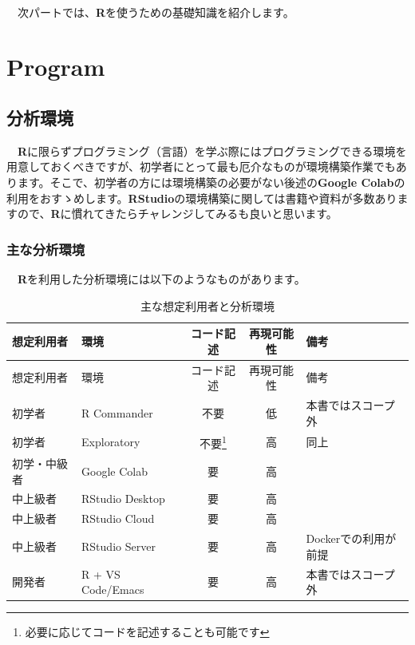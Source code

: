 \documentclass[
  12pt,
]{book}
\begin{document}
　

　次パートでは、\textbf{R}を使うための基礎知識を紹介します。

\hypertarget{part-program}{%
\part{Program}\label{part-program}}

\hypertarget{ux5206ux6790ux74b0ux5883}{%
\chapter{分析環境}\label{ux5206ux6790ux74b0ux5883}}

　\textbf{R}に限らずプログラミング（言語）を学ぶ際にはプログラミングできる環境を用意しておくべきですが、初学者にとって最も厄介なものが環境構築作業でもあります。そこで、初学者の方には環境構築の必要がない後述の\textbf{Google Colab}の利用をおすゝめします。\textbf{RStudio}の環境構築に関しては書籍や資料が多数ありますので、\textbf{R}に慣れてきたらチャレンジしてみるも良いと思います。

\hypertarget{ux4e3bux306aux5206ux6790ux74b0ux5883}{%
\section{主な分析環境}\label{ux4e3bux306aux5206ux6790ux74b0ux5883}}

　\textbf{R}を利用した分析環境には以下のようなものがあります。

\begin{longtable}[]{@{}llccl@{}}
\caption{主な想定利用者と分析環境}\tabularnewline
\toprule
想定利用者 & 環境 & コード記述 & 再現可能性 & 備考 \\
\midrule
\endfirsthead
\toprule
想定利用者 & 環境 & コード記述 & 再現可能性 & 備考 \\
\midrule
\endhead
初学者 & R Commander & 不要 & 低 & 本書ではスコープ外 \\
初学者 & Exploratory & 不要\footnote{必要に応じてコードを記述することも可能です} & 高 & 同上 \\
初学・中級者 & Google Colab & 要 & 高 & \\
中上級者 & RStudio Desktop & 要 & 高 & \\
中上級者 & RStudio Cloud & 要 & 高 & \\
中上級者 & RStudio Server & 要 & 高 & Dockerでの利用が前提 \\
開発者 & R + VS Code/Emacs & 要 & 高 & 本書ではスコープ外 \\
\bottomrule
\end{longtable}
\end{document}
